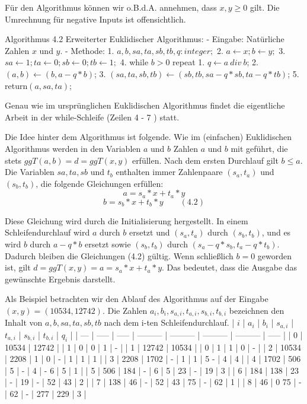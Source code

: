 \documentclass[a4paper]{article}
\begin{document}
\begin{multicols}{3}
Für den Algorithmus können wir o.B.d.A. annehmen, dass $x,y\geq 0$ gilt. Die Umrechnung für negative Inputs ist offensichtlich.

Algorithmus 4.2 Erweiterter Euklidischer Algorithmus:
- Eingabe: Natürliche Zahlen $x$ und $y$.
- Methode:
  1. $a,b,sa,ta,sb,tb,q:integer;$
  2. $a\leftarrow x; b\leftarrow y;$
  3. $sa\leftarrow 1; ta\leftarrow 0; sb\leftarrow 0; tb\leftarrow 1;$
  4. while $b> 0$ repeat
     1. $q\leftarrow a\ div\ b$;
     2. $(a,b)\leftarrow (b,a-q*b)$;
     3. $(sa,ta,sb,tb)\leftarrow (sb,tb,sa-q*sb,ta-q*tb)$;
  5. return$(a,sa,ta)$;

Genau wie im ursprünglichen Euklidischen Algorithmus findet die eigentliche Arbeit in der while-Schleife (Zeilen 4 - 7 ) statt.

Die Idee hinter dem Algorithmus ist folgende. Wie im (einfachen) Euklidischen Algorithmus werden in den Variablen $a$ und $b$ Zahlen $a$ und $b$ mit geführt, die stets $ggT(a,b) =d= ggT(x,y)$ erfüllen. Nach dem ersten Durchlauf gilt $b\leq a$. Die Variablen $sa,ta,sb$ und $t_b$ enthalten immer Zahlenpaare $(s_a,t_a)$ und $(s_b,t_b)$, die folgende Gleichungen erfüllen:
$$a=s_a*x+t_a*y$$
$$b=s_b*x+t_b*y \quad\quad(4.2)$$

Diese Gleichung wird durch die Initialisierung hergestellt. In einem Schleifendurchlauf wird $a$ durch $b$ ersetzt und $(s_a,t_a)$ durch $(s_b,t_b)$, und es wird $b$ durch $a-q*b$ ersetzt sowie $(s_b,t_b)$ durch $(s_a-q*s_b, t_a-q*t_b)$. Dadurch bleiben die Gleichungen (4.2) gültig. Wenn schließlich $b=0$ geworden ist, gilt $d=ggT(x,y) =a=s_a*x+t_a*y$. Das bedeutet, dass die Ausgabe das gewünschte Ergebnis darstellt.

Als Beispiel betrachten wir den Ablauf des Algorithmus auf der Eingabe $(x,y) =(10534,12742)$. Die Zahlen $a_i,b_i,s_{a,i},t_{a,i},s_{b,i},t_{b,i}$ bezeichnen den Inhalt von $a,b,sa,ta,sb,tb$ nach dem i-ten Schleifendurchlauf.
| $i$ | $a_i$ | $b_i$ | $s_{a,i}$ | $t_{a,i}$ | $s_{b,i}$ | $t_{b,i}$ | $q_i$ |
| --- | ----- | ----- | --------- | --------- | --------- | --------- | ----- |
| 0   | 10534 | 12742 |           | 1         | 0         | 0         | 1     | -  |
| 1   | 12742 | 10534 |           | 0         | 1         | 1         | 0     | -  |
| 2   | 10534 | 2208  | 1         | 0         | -         | 1         | 1     | 1  |
| 3   | 2208  | 1702  | -         | 1         | 1         | 5 -       | 4     | 4  |
| 4   | 1702  | 506   | 5         | -         | 4         | - 6       | 5     | 1  |
| 5   | 506   | 184   | -         | 6         | 5         | 23        | -     | 19 | 3 |
| 6   | 184   | 138   | 23        | -         | 19        | -         | 52    | 43 | 2 |
| 7   | 138   | 46    | -         | 52        | 43        | 75        | -     | 62 | 1 |
| 8   | 46    | 0 75  | -         | 62        | -         | 277       | 229   | 3  |


\end{multicols}
\end{document}
